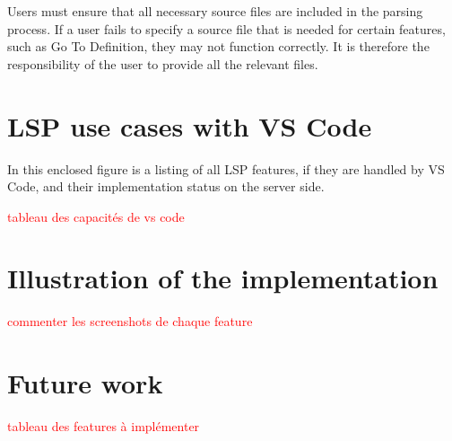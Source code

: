 \documentclass[10pt]{article}
\begin{document}
\begin{singlespace}
Users must ensure that all necessary source files are included in the parsing process. If a user fails to specify a source file that is needed for certain features, such as Go To Definition, they may not function correctly. It is therefore the responsibility of the user to provide all the relevant files.


\section{LSP use cases with VS Code}
In this enclosed figure is a listing of all LSP features, if they are handled by VS Code, and their implementation status on the server side.

\textcolor{red}{tableau des capacités de vs code}


\section{Illustration of the implementation}
\textcolor{red}{commenter les screenshots de chaque feature}

\section{Future work}
\textcolor{red}{tableau des features à implémenter}


% 

\end{singlespace}
\end{document}
